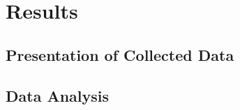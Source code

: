 \chapter{Results}
\label{sec:results}

\medskip\lipsum[1]


\section{Presentation of Collected Data}

\medskip\lipsum[1]

\section{Data Analysis}


\medskip\lipsum[3]